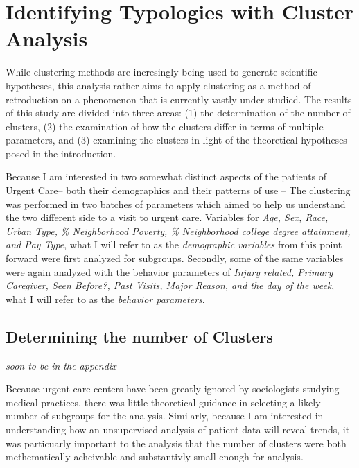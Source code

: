 \documentclass[12pt,twoside]{reedthesis}
\begin{document}
  \section{Identifying Typologies with Cluster
  Analysis}\label{identifying-typologies-with-cluster-analysis}
  
  While clustering methods are incresingly being used to generate
  scientific hypotheses, this analysis rather aims to apply clustering as
  a method of retroduction on a phenomenon that is currently vastly under
  studied. The results of this study are divided into three areas: (1) the
  determination of the number of clusters, (2) the examination of how the
  clusters differ in terms of multiple parameters, and (3) examining the
  clusters in light of the theoretical hypotheses posed in the
  introduction.
  
  Because I am interested in two somewhat distinct aspects of the patients
  of Urgent Care-- both their demographics and their patterns of use --
  The clustering was performed in two batches of parameters which aimed to
  help us understand the two different side to a visit to urgent care.
  Variables for \emph{Age, Sex, Race, Urban Type, \% Neighborhood Poverty,
  \% Neighborhood college degree attainment, and Pay Type}, what I will
  refer to as the \emph{demographic variables} from this point forward
  were first analyzed for subgroups. Secondly, some of the same variables
  were again analyzed with the behavior parameters of \emph{Injury
  related, Primary Caregiver, Seen Before?, Past Visits, Major Reason, and
  the day of the week}, what I will refer to as the \emph{behavior
  parameters}.
  
  \subsection{Determining the number of
  Clusters}\label{determining-the-number-of-clusters-1}
  
  \emph{soon to be in the appendix}
  
  Because urgent care centers have been greatly ignored by sociologists
  studying medical practices, there was little theoretical guidance in
  selecting a likely number of subgroups for the analysis. Similarly,
  because I am interested in understanding how an unsupervised analysis of
  patient data will reveal trends, it was particuarly important to the
  analysis that the number of clusters were both methematically acheivable
  and substantivly small enough for analysis.
  
\end{document}
